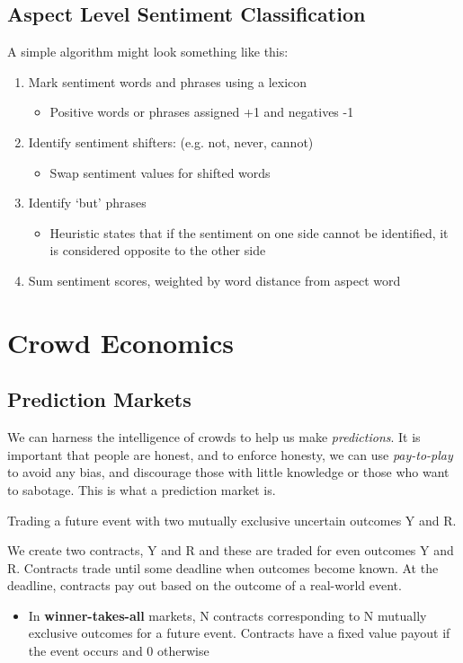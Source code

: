 \documentclass[11pt,a4paper,titlepage,dvipsnames,cmyk]{scrartcl}
\begin{document}
\subsection{Aspect Level Sentiment Classification}
A simple algorithm might look something like this:
\begin{enumerate}
\item Mark sentiment words and phrases using a lexicon
\begin{itemize}
    \item Positive words or phrases assigned +1 and negatives -1
\end{itemize}
\item Identify sentiment shifters: (e.g. not, never, cannot)
\begin{itemize}
    \item Swap sentiment values for shifted words
\end{itemize}
\item Identify `but' phrases
\begin{itemize}
    \item Heuristic states that if the sentiment on one side cannot be identified, it is considered opposite to the other side
\end{itemize}
\item Sum sentiment scores, weighted by word distance from aspect word
\end{enumerate}

\section{Crowd Economics}
\subsection{Prediction Markets}
We can harness the intelligence of crowds to help us make \textit{predictions}. It is important that people are honest, and to enforce honesty, we can use \textit{pay-to-play} to avoid any bias, and discourage those with little knowledge or those who want to sabotage. This is what a prediction market is.

\begin{tcolorbox} [space to upper,
collower=white,
title={Prediction Market},
nobeforeafter,
halign lower=flush right, ]
Trading a future event with two mutually exclusive uncertain outcomes Y and R.
\end{tcolorbox}

We create two contracts, Y and R and these are traded for even outcomes Y and R. Contracts trade until some deadline when outcomes become known. At the deadline, contracts pay out based on the outcome of a real-world event.
\begin{itemize}
    \item In \textbf{winner-takes-all} markets, N contracts corresponding to N mutually exclusive outcomes for a future event. Contracts have a fixed value payout if the event occurs and 0 otherwise
\end{itemize}
\end{document}
